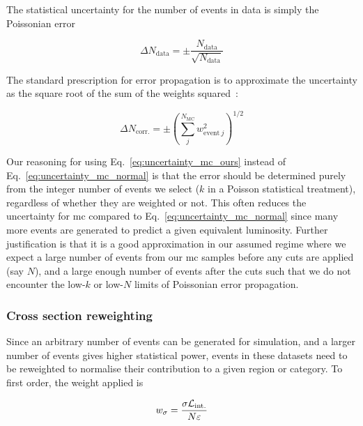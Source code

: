 The statistical uncertainty for the number of events in data is simply the Poissonian error

\begin{equation}
\Delta N_{\mathrm{data}} = \pm \frac{ N_{\mathrm{data}} }{ \sqrt{N_{\mathrm{data}}} }
\label{eq:uncertainty_data}
\end{equation}

The standard prescription for error propagation is to approximate the uncertainty as the square root of the sum of the weights squared~\cite{bevington2003data}:

\begin{equation}
\Delta N_{\mathrm{corr.}} = \pm \left( \sum_j^{N_{\mathrm{MC}}} w_{\mathrm{event} \ j}^2 \right) ^{1/2}
\label{eq:uncertainty_mc_normal}
\end{equation}

Our reasoning for using Eq.~\ref{eq:uncertainty_mc_ours} instead of Eq.~\ref{eq:uncertainty_mc_normal} is that the error should be determined purely from the integer number of events we select ($k$ in a Poisson statistical treatment), regardless of whether they are weighted or not. This often reduces the uncertainty for \acrshort{mc} compared to Eq.~\ref{eq:uncertainty_mc_normal} since many more events are generated to predict a given equivalent luminosity. Further justification is that it is a good approximation in our assumed regime where we expect a large number of events from our \acrshort{mc} samples before any cuts are applied (say $N$), and a large enough number of events after the cuts such that we do not encounter the low-$k$ or low-$N$ limits of Poissonian error propagation.




\subsubsection{Cross section reweighting}
\label{subsubsec:xs_weighting}

Since an arbitrary number of events can be generated for simulation, and a larger number of events gives higher statistical power, events in these datasets need to be reweighted to normalise their contribution to a given region or category. To first order, the weight applied is

\begin{equation}
w_{\sigma} = \frac{ \sigma \mathcal{L}_{\mathrm{int.}} }{ N \varepsilon }
\end{equation}


